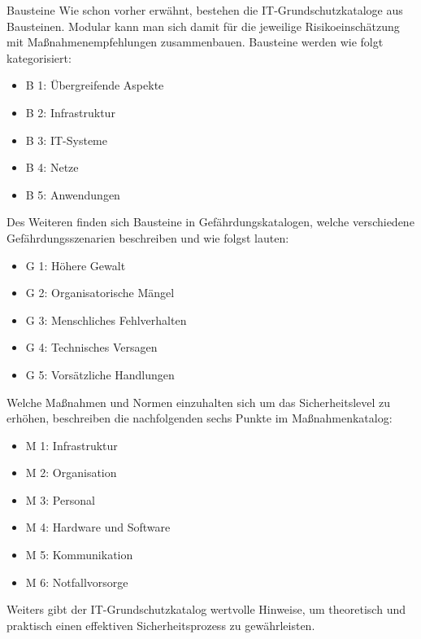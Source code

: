  \label{Bausteine}
 \begin{section} {Bausteine}
 	Wie schon vorher erwähnt, bestehen die IT-Grundschutzkataloge aus Bausteinen.
 	Modular kann man sich damit für die jeweilige Risikoeinschätzung mit Maßnahmenempfehlungen  zusammenbauen.
 	Bausteine werden wie folgt kategorisiert:
 	
 	\begin{itemize}
 		\item B 1: Übergreifende Aspekte
 		\item B 2: Infrastruktur
 		\item B 3: IT-Systeme
 		\item B 4: Netze
 		\item B 5: Anwendungen
 	\end{itemize}
 	
 	Des Weiteren finden sich Bausteine in Gefährdungskatalogen, welche verschiedene Gefährdungsszenarien 
 	beschreiben und wie folgst lauten:
 	
 	\begin{itemize}
 		\item G 1: Höhere Gewalt
 		\item G 2: Organisatorische Mängel
 		\item G 3: Menschliches Fehlverhalten
 		\item G 4: Technisches Versagen
 		\item G 5: Vorsätzliche Handlungen
 	\end{itemize}
 	
 	Welche Maßnahmen und Normen einzuhalten sich um das Sicherheitslevel zu erhöhen, beschreiben die 
 	nachfolgenden sechs Punkte im Maßnahmenkatalog: 
 	\begin{itemize}
 		\item M 1: Infrastruktur
 		\item M 2: Organisation
 		\item M 3: Personal
 		\item M 4: Hardware und Software
 		\item M 5: Kommunikation
 		\item M 6: Notfallvorsorge
 	\end{itemize}
 	
 	Weiters gibt der IT-Grundschutzkatalog  wertvolle Hinweise, 
 	um theoretisch und praktisch einen effektiven Sicherheitsprozess zu gewährleisten.
 \end{section}

